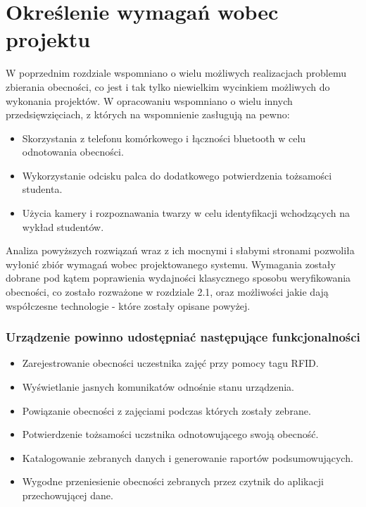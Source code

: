 \documentclass[declaration,shortabstract, mgr]{iithesis}
\begin{document}
\section{Określenie wymagań wobec projektu}
\indent W poprzednim rozdziale wspomniano o wielu możliwych realizacjach problemu zbierania obecności, co jest i tak tylko niewielkim wycinkiem możliwych do wykonania projektów. W opracowaniu \cite{review} wspomniano o wielu innych przedsięwzięciach, z których na wspomnienie zasługują na pewno:

\begin{itemize}
\item Skorzystania z telefonu komórkowego i łączności bluetooth w celu odnotowania obecności.
\item Wykorzystanie odcisku palca do dodatkowego potwierdzenia tożsamości studenta.
\item Użycia kamery i rozpoznawania twarzy w celu identyfikacji wchodzących na wykład studentów.
\end{itemize}

\indent Analiza powyższych rozwiązań wraz z ich mocnymi i słabymi stronami pozwoliła wyłonić zbiór wymagań wobec projektowanego systemu. Wymagania zostały dobrane pod kątem poprawienia wydajności klasycznego sposobu weryfikowania obecności, co zostało rozważone w rozdziale 2.1, oraz możliwości jakie dają współczesne technologie - które zostały opisane powyżej.

\subsubsection{Urządzenie powinno udostępniać następujące funkcjonalności}

\begin{itemize}
\item Zarejestrowanie obecności uczestnika zajęć przy pomocy tagu RFID.
\item Wyświetlanie jasnych komunikatów odnośnie stanu urządzenia.
\item Powiązanie obecności z zajęciami podczas których zostały zebrane.
\item Potwierdzenie tożsamości uczstnika odnotowującego swoją obecność.
\item Katalogowanie zebranych danych i generowanie raportów podsumowujących.
\item Wygodne przeniesienie obecności zebranych przez czytnik do aplikacji przechowującej dane.
\end{itemize}
\end{document}
